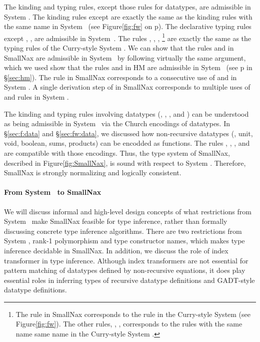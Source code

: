 The kinding and typing rules, except those rules for datatypes, are admissible
in System \Fw. The kinding rules except  are exactly the same as
the kinding rules with the same name in System \Fw\ (see Figure\;\ref{fig:fw}
on p\pageref{fig:fw}). The declarative typing rules except ,
,  are admissible in System~\Fw. The rules
, , , \footnote{
	The  rule in SmallNax corresponds to
	the  rule in the Curry-style System \Fw
	(see Figure\;\ref{fig:fw}). The other rules, ,
	,  corresponds to the rules with
	the same name same name in the Curry-style System \Fw. }
are exactly the same as the typing rules of the Curry-style System \Fw.
We can show that the rules  and  in SmallNax are
admissible in System \Fw\ by following virtually the same argument, which
we used show that the rules  and  in HM are
admissible in Sytem \F\ (see p\pageref{hm:LetAdmissibleFw} in \S\ref{sec:hm}).
The  rule in SmallNax corresponds to a consecutive use of
 and  in System \Fw. A single derivation step of
 in SmallNax corresponds to multiple uses of 
and  rules in System \Fw.

The kinding and typing rules involving datatypes (,
, , and ) can be understood as
being admissible in System \Fw\ via the Church encodings of datatypes.
In \S\ref{sec:f:data} and \S\ref{sec:fw:data}, we discussed
how non-recursive datatypes (\eg, unit, void, boolean, sums, products)
can be encodded as functions. The rules , ,
, and  are compatible with those encodings.
Thus, the type system of SmallNax, described in Figure\;\ref{fig:SmallNax},
is sound with respect to System \Fw.
Therefore, SmallNax is strongly normalizing and logically consistent.

\paragraph{From System \Fw\ to SmallNax}
We will discuss informal and high-level design concepts of what restrictions
from System \Fw\ make SmallNax feasible for type inference, rather than
formally discussing concrete type inference algorithms. There are two
restrictions from System \Fw, rank-1 polymorphism and type constructor names,
which makes type inference decidable in SmallNax. In addition, we discuss
the role of index transformer in type inference. Although index transformers
are not essential for pattern matching of datatypes defined by non-recursive
equations, it does play essential roles in inferring types of recursive
datatype definitions and GADT-style datatype definitions.


